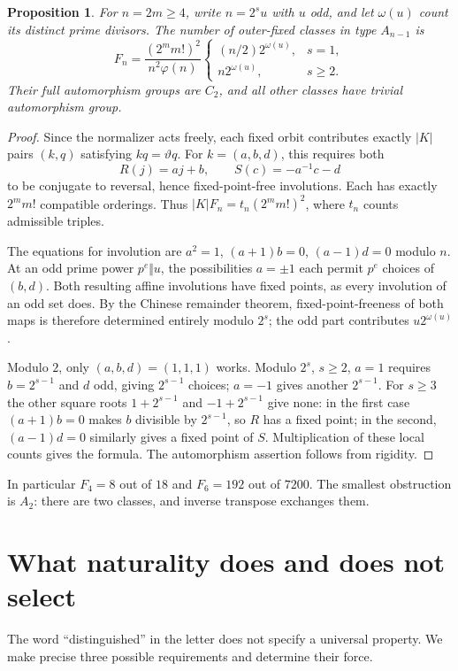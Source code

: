 \documentclass[11pt]{article}
\newtheorem{proposition}[theorem]{Proposition}
\theoremstyle{definition}\newtheorem{definition}[theorem]{Definition}
\theoremstyle{remark}\newtheorem{remark}[theorem]{Remark}
\begin{document}
\begin{proposition}\label{prop:fixedcount}
For $n=2m\geq4$, write $n=2^s u$ with $u$ odd, and let $\omega(u)$ count its distinct prime divisors. The number of outer-fixed classes in type $A_{n-1}$ is
\[
 F_n=\frac{(2^m m!)^2}{n^2\varphi(n)}
 \begin{cases}
 (n/2)2^{\omega(u)},&s=1,\\
 n2^{\omega(u)},&s\geq2.
 \end{cases}
\]
Their full automorphism groups are $C_2$, and all other classes have trivial automorphism group.
\end{proposition}
\begin{proof}
Since the normalizer acts freely, each fixed orbit contributes exactly $|K|$ pairs $(k,q)$ satisfying $kq=\vartheta q$. For $k=(a,b,d)$, this requires both
\[
 R(j)=aj+b,\qquad S(c)=-a^{-1}c-d
\]
to be conjugate to reversal, hence fixed-point-free involutions. Each has exactly $2^m m!$ compatible orderings. Thus $|K|F_n=t_n(2^m m!)^2$, where $t_n$ counts admissible triples.

The equations for involution are $a^2=1$, $(a+1)b=0$, $(a-1)d=0$ modulo $n$. At an odd prime power $p^e\Vert u$, the possibilities $a=\pm1$ each permit $p^e$ choices of $(b,d)$. Both resulting affine involutions have fixed points, as every involution of an odd set does. By the Chinese remainder theorem, fixed-point-freeness of both maps is therefore determined entirely modulo $2^s$; the odd part contributes $u2^{\omega(u)}$.

Modulo $2$, only $(a,b,d)=(1,1,1)$ works. Modulo $2^s$, $s\geq2$, $a=1$ requires $b=2^{s-1}$ and $d$ odd, giving $2^{s-1}$ choices; $a=-1$ gives another $2^{s-1}$. For $s\geq3$ the other square roots $1+2^{s-1}$ and $-1+2^{s-1}$ give none: in the first case $(a+1)b=0$ makes $b$ divisible by $2^{s-1}$, so $R$ has a fixed point; in the second, $(a-1)d=0$ similarly gives a fixed point of $S$. Multiplication of these local counts gives the formula. The automorphism assertion follows from rigidity.
\end{proof}

In particular $F_4=8$ out of $18$ and $F_6=192$ out of $7200$. The smallest obstruction is $A_2$: there are two classes, and inverse transpose exchanges them.

\section{What naturality does and does not select}\label{sec:natural}
The word ``distinguished'' in the letter does not specify a universal property. We make precise three possible requirements and determine their force.
\end{document}
